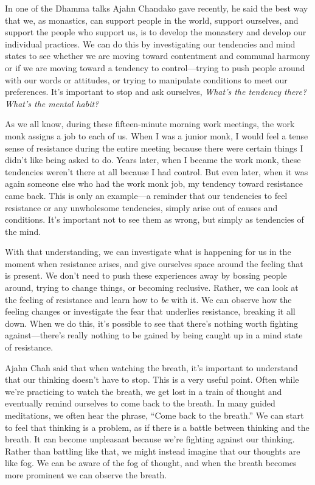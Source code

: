 
In one of the Dhamma talks Ajahn Chandako gave recently, he said the 
best way that we, as monastics, can support people in the world, 
support ourselves, and support the people who support us, is to develop 
the monastery and develop our individual practices. We can do this by 
investigating our tendencies and mind states to see whether we are 
moving toward contentment and communal harmony or if we are moving 
toward a tendency to control---trying to push people around with our 
words or attitudes, or trying to manipulate conditions to meet our 
preferences. It's important to stop and ask ourselves, \emph{What's the 
tendency there? What's the mental habit?}

As we all know, during these fifteen-minute morning work meetings, the 
work monk assigns a job to each of us. When I was a junior monk, I 
would feel a tense sense of resistance during the entire meeting 
because there were certain things I didn't like being asked to do. 
Years later, when I became the work monk, these tendencies weren't 
there at all because I had control. But even later, when it was again 
someone else who had the work monk job, my tendency toward resistance 
came back. This is only an example---a reminder that our tendencies to 
feel resistance or any unwholesome tendencies, simply arise out of 
causes and conditions. It's important not to see them as wrong, but 
simply as tendencies of the mind.

With that understanding, we can investigate what is happening for us in 
the moment when resistance arises, and give ourselves space around the 
feeling that is present. We don't need to push these experiences away 
by bossing people around, trying to change things, or becoming 
reclusive. Rather, we can look at the feeling of resistance and learn 
how to \emph{be} with it. We can observe how the feeling changes or 
investigate the fear that underlies resistance, breaking it all down. 
When we do this, it's possible to see that there's nothing worth 
fighting against---there's really nothing to be gained by being caught 
up in a mind state of resistance.


Ajahn Chah said that when watching the breath, it's important to 
understand that our thinking doesn't have to stop. This is a very 
useful point. Often while we're practicing to watch the breath, we get 
lost in a train of thought and eventually remind ourselves to come back 
to the breath. In many guided meditations, we often hear the phrase, 
``Come back to the breath.'' We can start to feel that thinking is a 
problem, as if there is a battle between thinking and the breath. It 
can become unpleasant because we're fighting against our thinking. 
Rather than battling like that, we might instead imagine that our 
thoughts are like fog. We can be aware of the fog of thought, and when 
the breath becomes more prominent we can observe the breath.

